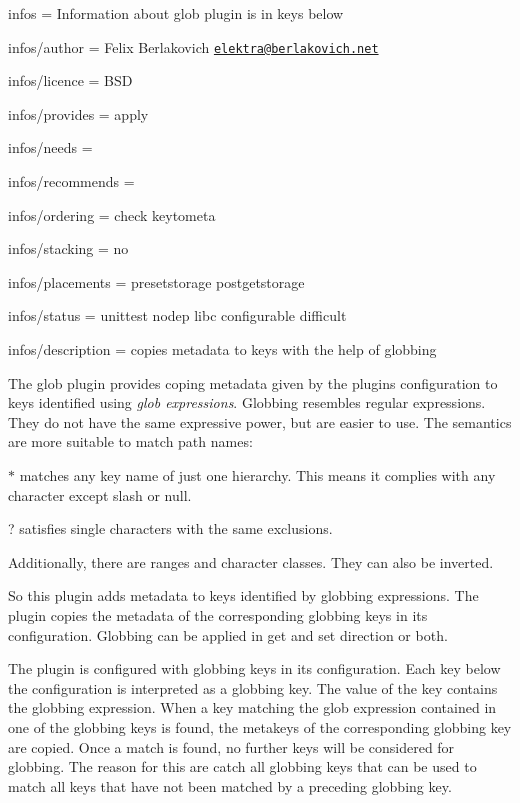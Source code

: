 
\begin{DoxyItemize}
\item infos = Information about glob plugin is in keys below
\item infos/author = Felix Berlakovich \href{mailto:elektra@berlakovich.net}{\tt elektra@berlakovich.\+net}
\item infos/licence = B\+SD
\item infos/provides = apply
\item infos/needs =
\item infos/recommends =
\item infos/ordering = check keytometa
\item infos/stacking = no
\item infos/placements = presetstorage postgetstorage
\item infos/status = unittest nodep libc configurable difficult
\item infos/description = copies metadata to keys with the help of globbing
\end{DoxyItemize}

The glob plugin provides coping metadata given by the plugin\textquotesingle{}s configuration to keys identified using {\itshape glob expressions}. Globbing resembles regular expressions. They do not have the same expressive power, but are easier to use. The semantics are more suitable to match path names\+:


\begin{DoxyItemize}
\item {\ttfamily $\ast$} matches any key name of just one hierarchy. This means it complies with any character except slash or null.
\item {\ttfamily ?} satisfies single characters with the same exclusions.
\item Additionally, there are ranges and character classes. They can also be inverted.
\end{DoxyItemize}

So this plugin adds metadata to keys identified by globbing expressions. The plugin copies the metadata of the corresponding globbing keys in its configuration. Globbing can be applied in get and set direction or both.

The plugin is configured with globbing keys in its configuration. Each key below the configuration is interpreted as a globbing key. The value of the key contains the globbing expression. When a key matching the glob expression contained in one of the globbing keys is found, the metakeys of the corresponding globbing key are copied. Once a match is found, no further keys will be considered for globbing. The reason for this are catch all globbing keys that can be used to match all keys that have not been matched by a preceding globbing key.

